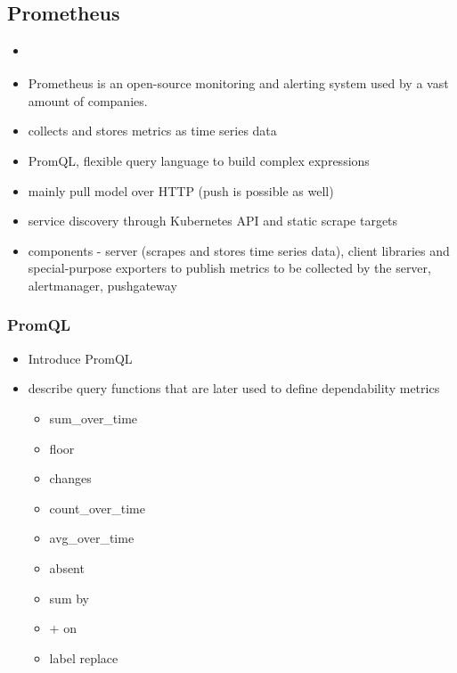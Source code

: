 \subsection{Prometheus}

\begin{itemize}
	\item \cite{Prometheus}
	\item Prometheus is an open-source monitoring and alerting system used by a vast amount of companies.
	\item collects and stores metrics as time series data
	\item PromQL, flexible query language to build complex expressions
	\item mainly pull model over HTTP (push is possible as well)
	\item service discovery through \eg Kubernetes API and static scrape targets
	\item components - server (scrapes and stores time series data), client libraries and special-purpose exporters to publish metrics to be collected by the server, alertmanager, pushgateway
\end{itemize}

\subsubsection{PromQL} \label{background-promql}

\begin{itemize}
	\item Introduce PromQL \cite{PrometheusQueryingBasics}
	\item describe query functions that are later used to define dependability metrics \cite{PrometheusQueryingFunctions} \cite{PrometheusQueryingOperators}
	\begin{itemize}
		\item sum\_over\_time
		\item floor
		\item changes
		\item count\_over\_time
		\item avg\_over\_time
		\item absent
		\item sum by
		\item + on
		\item label replace
	\end{itemize}
\end{itemize}

